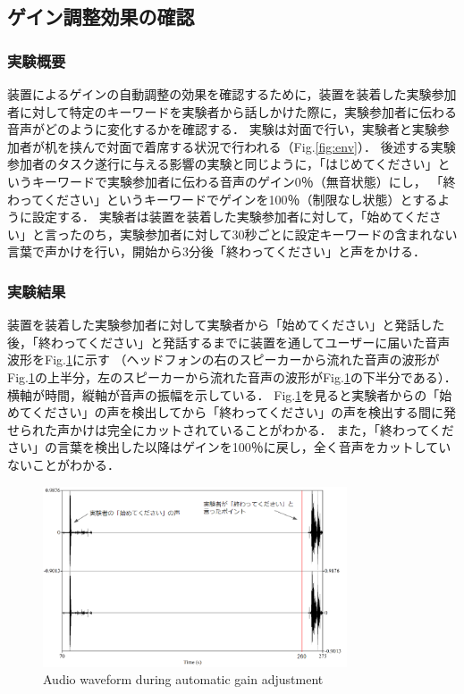 \documentclass[a4paper]{jarticle}
\begin{document}
\subsection{ゲイン調整効果の確認}
\subsubsection{実験概要}
装置によるゲインの自動調整の効果を確認するために，装置を装着した実験参加者に対して特定のキーワードを実験者から話しかけた際に，実験参加者に伝わる音声がどのように変化するかを確認する．
実験は対面で行い，実験者と実験参加者が机を挟んで対面で着席する状況で行われる（Fig.\ref{fig:env}）．
後述する実験参加者のタスク遂行に与える影響の実験と同じように，「はじめてください」というキーワードで実験参加者に伝わる音声のゲイン0％（無音状態）にし，
「終わってください」というキーワードでゲインを100％（制限なし状態）とするように設定する．
実験者は装置を装着した実験参加者に対して，「始めてください」と言ったのち，実験参加者に対して30秒ごとに設定キーワードの含まれない言葉で声かけを行い，開始から3分後「終わってください」と声をかける．
\subsubsection{実験結果}
装置を装着した実験参加者に対して実験者から「始めてください」と発話した後，「終わってください」と発話するまでに装置を通してユーザーに届いた音声波形をFig.\ref{fig:voice}に示す
（ヘッドフォンの右のスピーカーから流れた音声の波形がFig.\ref{fig:voice}の上半分，左のスピーカーから流れた音声の波形がFig.\ref{fig:voice}の下半分である）．
横軸が時間，縦軸が音声の振幅を示している．
Fig.\ref{fig:voice}を見ると実験者からの「始めてください」の声を検出してから「終わってください」の声を検出する間に発せられた声かけは完全にカットされていることがわかる．
また，「終わってください」の言葉を検出した以降はゲインを100％に戻し，全く音声をカットしていないことがわかる．
\begin{figure}[htbp]
  \begin{center}
  \includegraphics[width=90mm]{voice.PNG}
  \caption{Audio waveform during automatic gain adjustment}
  \label{fig:voice}
  \end{center}
  \end{figure}
\end{document}
